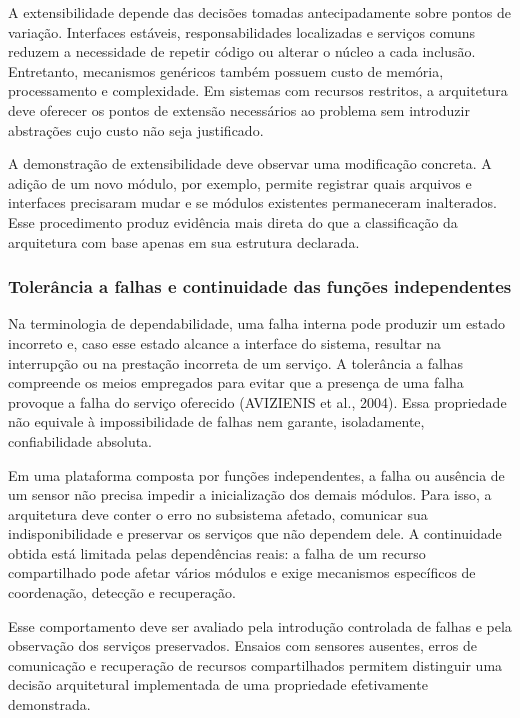 \documentclass[a4paper,12pt]{article}
\begin{document}
A extensibilidade depende das decis\~oes tomadas antecipadamente sobre pontos de varia\c{c}\~ao. Interfaces est\'aveis, responsabilidades localizadas e servi\c{c}os comuns reduzem a necessidade de repetir c\'odigo ou alterar o n\'ucleo a cada inclus\~ao. Entretanto, mecanismos gen\'ericos tamb\'em possuem custo de mem\'oria, processamento e complexidade. Em sistemas com recursos restritos, a arquitetura deve oferecer os pontos de extens\~ao necess\'arios ao problema sem introduzir abstra\c{c}\~oes cujo custo n\~ao seja justificado.


A demonstra\c{c}\~ao de extensibilidade deve observar uma modifica\c{c}\~ao concreta. A adi\c{c}\~ao de um novo m\'odulo, por exemplo, permite registrar quais arquivos e interfaces precisaram mudar e se m\'odulos existentes permaneceram inalterados. Esse procedimento produz evid\^encia mais direta do que a classifica\c{c}\~ao da arquitetura com base apenas em sua estrutura declarada.


\subsubsection{Toler\^ancia a falhas e continuidade das fun\c{c}\~oes independentes}


Na terminologia de dependabilidade, uma falha interna pode produzir um estado incorreto e, caso esse estado alcance a interface do sistema, resultar na interrup\c{c}\~ao ou na presta\c{c}\~ao incorreta de um servi\c{c}o. A toler\^ancia a falhas compreende os meios empregados para evitar que a presen\c{c}a de uma falha provoque a falha do servi\c{c}o oferecido (AVIZIENIS et al., 2004). Essa propriedade n\~ao equivale \`a impossibilidade de falhas nem garante, isoladamente, confiabilidade absoluta.


Em uma plataforma composta por fun\c{c}\~oes independentes, a falha ou aus\^encia de um sensor n\~ao precisa impedir a inicializa\c{c}\~ao dos demais m\'odulos. Para isso, a arquitetura deve conter o erro no subsistema afetado, comunicar sua indisponibilidade e preservar os servi\c{c}os que n\~ao dependem dele. A continuidade obtida est\'a limitada pelas depend\^encias reais: a falha de um recurso compartilhado pode afetar v\'arios m\'odulos e exige mecanismos espec\'ificos de coordena\c{c}\~ao, detec\c{c}\~ao e recupera\c{c}\~ao.


Esse comportamento deve ser avaliado pela introdu\c{c}\~ao controlada de falhas e pela observa\c{c}\~ao dos servi\c{c}os preservados. Ensaios com sensores ausentes, erros de comunica\c{c}\~ao e recupera\c{c}\~ao de recursos compartilhados permitem distinguir uma decis\~ao arquitetural implementada de uma propriedade efetivamente demonstrada.
\end{document}
